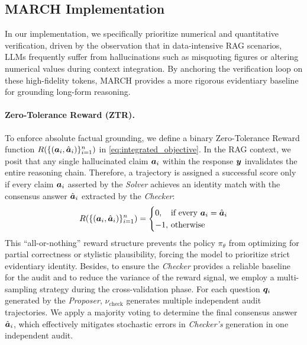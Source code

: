 \documentclass[10pt, a4paper, logo]{googledeepmind} %
\begin{document}
\subsection{MARCH Implementation}\label{met:implementation}
In our implementation, we specifically prioritize {numerical and quantitative verification}, driven by the observation that in data-intensive RAG scenarios, LLMs frequently suffer from hallucinations such as misquoting figures or altering numerical values during context integration. By anchoring the verification loop on these high-fidelity tokens, MARCH provides a more rigorous evidentiary baseline for grounding long-form reasoning.
\paragraph{Zero-Tolerance Reward (ZTR).}
To enforce absolute factual grounding, we define a binary {Zero-Tolerance Reward} function $R(\{({\bm{a}}_i, \hat{{\bm{a}}}_i)\}_{i=1}^n)$ in \eqref{eq:integrated_objective}. In the RAG context, we posit that any single hallucinated claim ${\bm{a}}_i$ within the response ${\bm{y}}$ invalidates the entire reasoning chain. Therefore, a trajectory is assigned a successful score only if every claim ${\bm{a}}_i$ asserted by the \textit{Solver} achieves an identity match with the consensus answer $\hat{{\bm{a}}}_i$ extracted by the \textit{Checker}:
\begin{equation}\label{eq:ztr_reward}
    R(\{(\va_i, \hat{\va}_i)\}_{i=1}^n) = 
    \begin{cases} 
    0, \hspace{-1.5ex}&\text{if every } \va_i = \hat{\va}_i %
    \\
    -1, \hspace{-1.5ex}&\text{otherwise}
    \end{cases}
\end{equation}
%
%
This ``all-or-nothing'' reward structure prevents the policy $\pi_\theta$ from optimizing for partial correctness or stylistic plausibility, forcing the model to prioritize strict evidentiary identity. Besides, to ensure the \textit{Checker} provides a reliable baseline for the audit and to reduce the variance of the reward signal, we employ a multi-sampling strategy during the cross-validation phase. For each question ${\bm{q}}_i$ generated by the \textit{Proposer},  $\nu_\text{check}$ generates multiple independent audit trajectories. We apply a majority voting to determine the final consensus answer $\hat{{\bm{a}}}_i$, which effectively mitigates stochastic errors in \textit{Checker's} generation in one independent audit.
\end{document}
